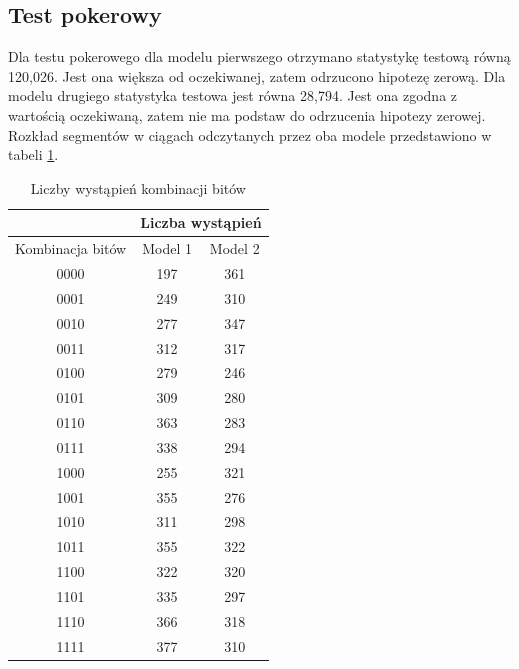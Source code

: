 \subsection{Test pokerowy}
\label{pokerWyniki}
Dla testu pokerowego dla modelu pierwszego otrzymano statystykę testową równą 120{,}026. Jest ona większa od oczekiwanej,
zatem odrzucono hipotezę zerową. Dla modelu drugiego statystyka testowa jest równa 28{,}794. Jest ona zgodna z wartością
oczekiwaną, zatem nie ma podstaw do odrzucenia hipotezy zerowej.
Rozkład segmentów w ciągach odczytanych przez oba modele przedstawiono w tabeli \ref{pokerTabela}.
\begin{table}[h]
    \centering
    \caption{Liczby wystąpień kombinacji bitów}
    \label{pokerTabela}
    \begin{tabular}{|c|c|c|} 
        \hline
        & \multicolumn{2}{c|}{Liczba wystąpień} \\
        \hline
        Kombinacja bitów & Model 1 & Model 2 \\
        \hline
        0000 & 197 & 361 \\
        \hline
        0001 & 249 & 310 \\
        \hline
        0010 & 277 & 347 \\
        \hline
        0011 & 312 & 317 \\
        \hline
        0100 & 279 & 246 \\
        \hline
        0101 & 309 & 280  \\
        \hline  
        0110 & 363 & 283 \\
        \hline  
        0111 & 338 & 294 \\
        \hline  
        1000 & 255 & 321 \\
        \hline  
        1001 & 355  & 276 \\
        \hline  
        1010 & 311 & 298 \\
        \hline  
        1011 & 355 & 322 \\
        \hline  
        1100 & 322 & 320 \\
        \hline  
        1101 & 335 & 297 \\
        \hline  
        1110 & 366 & 318 \\
        \hline  
        1111 & 377 & 310 \\
        \hline  
    \end{tabular} 
\end{table} 

